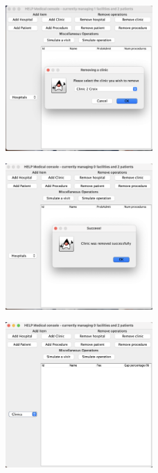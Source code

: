 \documentclass{article}
\begin{document}
\begin{figure}
  \begin{center}
  \includegraphics[width=0.5\textwidth]{./figures/Remove/Clinic_1.png}
  \end{center}
\end{figure}

\begin{figure}
  \begin{center}
    \includegraphics[width=0.5\textwidth]{./figures/Remove/Clinic_2.png}
  \end{center}
\end{figure}

\begin{figure}
  \begin{center}
  \includegraphics[width=0.5\textwidth]{./figures/Remove/Clinic_3.png}
  \end{center}
\end{figure}
\end{document}
